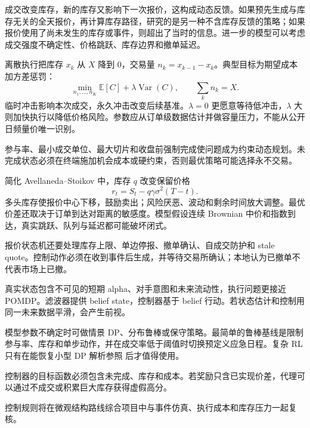 

成交改变库存，新的库存又影响下一次报价，这构成动态反馈。如果预先生成与库存无关的全天报价，再计算库存路径，研究的是另一种不含库存反馈的策略；如果报价使用了尚未发生的库存或事件，则超出了当时的信息。进一步的模型可以考虑成交强度不确定性、价格跳跃、库存边界和撤单延迟。


离散执行把库存 $x_k$ 从 $X$ 降到 0，交易量 $n_k=x_{k-1}-x_k$。典型目标为期望成本加方差惩罚：
\[
\min_{n_1,\ldots,n_K}
\mathbb E[C]+\lambda\operatorname{Var}(C),
\qquad \sum_kn_k=X.
\]
临时冲击影响本次成交，永久冲击改变后续基准。$\lambda=0$ 更愿意等待低冲击，$\lambda$ 大则加快执行以降低价格风险。参数应从订单级数据估计并做容量压力，不能从公开日频量价唯一识别。



参与率、最小成交单位、最大切片和收盘前强制完成使问题成为约束动态规划。未完成状态必须在终端施加机会成本或硬约束，否则最优策略可能选择永不交易。


简化 Avellaneda--Stoikov 中，库存 $q$ 改变保留价格
\[
r_t=S_t-q\gamma\sigma^2(T-t).
\]
多头库存使报价中心下移，鼓励卖出；风险厌恶、波动和剩余时间放大调整。最优价差还取决于订单到达对距离的敏感度。模型假设连续 Brownian 中价和指数到达，真实跳跃、队列与延迟都可能破坏闭式。

报价状态机还要处理库存上限、单边停报、撤单确认、自成交防护和 stale quote。控制动作必须在收到事件后生成，并等待交易所确认；本地认为已撤单不代表市场上已撤。


真实状态包含不可见的短期 alpha、对手意图和未来流动性，执行问题更接近 POMDP。滤波器提供 belief state，控制器基于 belief 行动。若状态估计和控制用同一未来数据平滑，会产生前视。

模型参数不确定时可做情景 DP、分布鲁棒或保守策略。最简单的鲁棒基线是限制参与率、库存和单步动作，并在成交率低于阈值时切换预定义应急日程。复杂 RL 只有在能恢复小型 DP 解析参照 后才值得使用。

\begin{diagnostic}
控制器的目标函数必须包含未完成、库存和成本。若奖励只含已实现价差，代理可以通过不成交或积累巨大库存获得虚假高分。
\end{diagnostic}

控制规则将在微观结构路线综合项目中与事件仿真、执行成本和库存压力一起复核。
